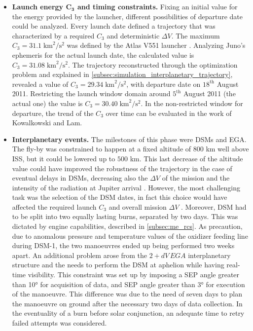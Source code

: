 \begin{itemize} 
    \item \textbf{Launch energy $\boldsymbol{C_3}$ and timing constraints.} Fixing an initial value for the energy provided by the launcher, different possibilities of departure date could be analyzed. Every launch date defined a trajectory that was characterized by a required $C_3$ and deterministic $\Delta V$.
    The maximum $C_3 = 31.1 \; \textrm{km}^2 / \textrm{s}^2$ was defined by the Atlas V551 launcher \cite{atlasV_juno}. Analyzing Juno's ephemeris for the actual launch date, the calculated value is $C_3 = 31.08 \; \textrm{km}^2 / \textrm{s}^2$. The trajectory reconstructed through the optimization problem and explained in \autoref{subsec:simulation_interplanetary_trajectory}, revealed a value of $C_3 =  29.34 \; \textrm{km}^2 / \textrm{s}^2$, with departure date on $18^{\textrm{th}}$ August 2011. Restricting the launch window domain around $5^{\textrm{th}}$ August 2011 (the actual one) the value is $C_3 = 30.40 \; \textrm{km}^2 / \textrm{s}^2$. In the non-restricted window for departure, the trend of the $C_3$ over time can be evaluated in the work of Kowalkowski and Lam\cite{launch_period}.
    \item \textbf{Interplanetary events.} The milestones of this phase were DSMs and EGA. The fly-by was constrained to happen at a fixed altitude of $800$ km well above ISS, but it could be lowered up to $500$ km.
    This last decrease of the altitude value could have improved the robustness of the trajectory in the case of eventual delays in DSMs, decreasing also the $\Delta V$ of the mission and the intensity of the radiation at Jupiter arrival \cite{pre_launch_update}. However, the most challenging task was the selection of the DSM dates, in fact this choice would have affected the required launch $C_3$ and overall mission $\Delta V$ \cite{launch_period}.
    Moreover, DSM had to be split into two equally lasting burns, separated by two days. This was dictated by engine capabilities, described in \autoref{subsec:me_rcs}. As precaution, due to anomalous pressure and temperature values of the oxidizer feeding line during DSM-1, the two manoeuvres ended up being performed two weeks apart.
    An additional problem arose from the $2+ dV\,EGA$ interplanetary structure and the needs to perform the DSM at aphelion while having real-time visibility. This constraint was set up by imposing a SEP angle greater than 10° for acquisition of data, and SEP angle greater than 3° for execution of the manoeuvre.
    This difference was due to the need of seven days to plan the manoeuvre on ground after the necessary two days of data collection. In the eventuality of a burn before solar conjunction, an adequate time to retry failed attempts was considered.

\end{itemize}
